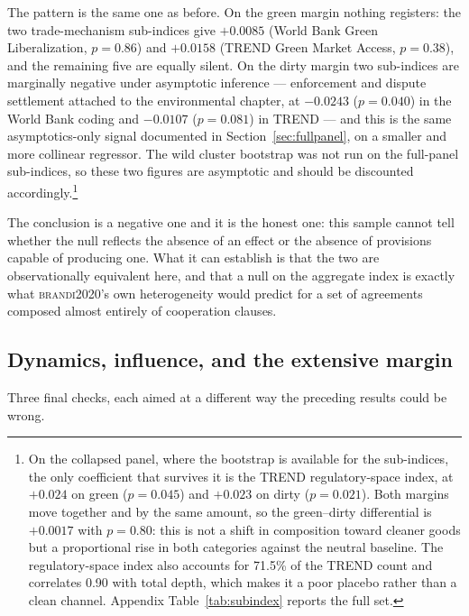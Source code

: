 \documentclass[11pt]{article}
\newcommand{\citet}[1]{\textsc{#1}}
\begin{document}
The pattern is the same one as before. On the green margin nothing registers: the two trade-mechanism
sub-indices give $+0.0085$ (World Bank Green Liberalization, $p = 0.86$) and $+0.0158$ (TREND Green
Market Access, $p = 0.38$), and the remaining five are equally silent. On the dirty margin two
sub-indices are marginally negative under asymptotic inference --- enforcement and dispute settlement
attached to the environmental chapter, at $-0.0243$ ($p = 0.040$) in the World Bank coding and
$-0.0107$ ($p = 0.081$) in TREND --- and this is the same asymptotics-only signal documented in
Section~\ref{sec:fullpanel}, on a smaller and more collinear regressor. The wild cluster bootstrap was
not run on the full-panel sub-indices, so these two figures are asymptotic and should be discounted
accordingly.\footnote{On the collapsed panel, where the bootstrap is available for the sub-indices,
the only coefficient that survives it is the TREND regulatory-space index, at $+0.024$ on green
($p = 0.045$) and $+0.023$ on dirty ($p = 0.021$). Both margins move together and by the same amount,
so the green--dirty differential is $+0.0017$ with $p = 0.80$: this is not a shift in composition
toward cleaner goods but a proportional rise in both categories against the neutral baseline. The
regulatory-space index also accounts for 71.5\% of the TREND count and correlates 0.90 with total
depth, which makes it a poor placebo rather than a clean channel. Appendix Table~\ref{tab:subindex}
reports the full set.}

The conclusion is a negative one and it is the honest one: this sample cannot tell whether the null
reflects the absence of an effect or the absence of provisions capable of producing one. What it can
establish is that the two are observationally equivalent here, and that a null on the aggregate index
is exactly what \citet{brandi2020}'s own heterogeneity would predict for a set of agreements composed
almost entirely of cooperation clauses.



\FloatBarrier
\subsection{Dynamics, influence, and the extensive margin}\label{sec:closing}

Three final checks, each aimed at a different way the preceding results could be wrong.
\end{document}
